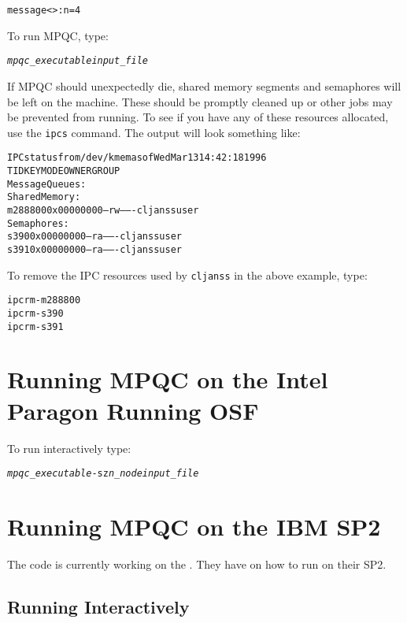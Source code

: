 \begin{alltt}
message<>: n = 4
\end{alltt}


To run MPQC, type:
\begin{alltt}
{\itshape mpqc_executable} {\itshape input_file}
\end{alltt}

If MPQC should unexpectedly die, shared memory segments and
semaphores will be left on the machine.  These should be promptly
cleaned up or other jobs may be prevented from running.  To
see if you have any of these resources allocated, use the
\verb|ipcs| command.  The output will look something
like:

\begin{alltt}
IPC status from /dev/kmem as of Wed Mar 13 14:42:18 1996
T     ID     KEY        MODE       OWNER    GROUP
Message Queues:
Shared Memory:
m 288800 0x00000000 --rw-------  cljanss     user
Semaphores:
s    390 0x00000000 --ra-------  cljanss     user
s    391 0x00000000 --ra-------  cljanss     user
\end{alltt}

To remove the IPC resources used by \verb|cljanss| in
the above example, type:

\begin{alltt}
ipcrm -m 288800
ipcrm -s 390
ipcrm -s 391
\end{alltt}

\section{Running MPQC on the Intel Paragon Running OSF}

To run interactively type:
\begin{alltt}
{\itshape mpqc_executable} -sz {\itshape n_node} {\itshape input_file}
\end{alltt}

\section{Running MPQC on the IBM SP2}

The code is currently working on the
.
They have 
on how to run on their SP2.

\subsection{Running Interactively}

